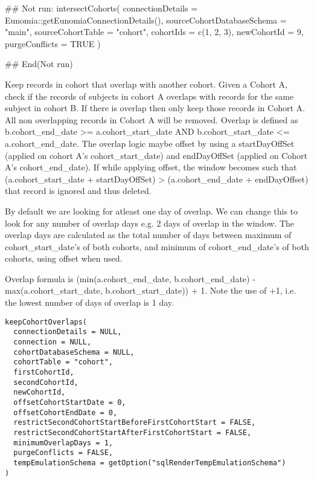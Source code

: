 \documentclass[a4paper]{book}
\begin{document}
%
\begin{Examples}
\begin{ExampleCode}
## Not run: 
intersectCohorts(
  connectionDetails = Eunomia::getEunomiaConnectionDetails(),
  sourceCohortDatabaseSchema = "main",
  sourceCohortTable = "cohort",
  cohortIds = c(1, 2, 3),
  newCohortId = 9,
  purgeConflicts = TRUE
)

## End(Not run)
\end{ExampleCode}
\end{Examples}
%
\begin{Description}\relax
Keep records in cohort that overlap with another cohort. Given a Cohort A, check if the records of
subjects in cohort A overlaps with records for the same subject in cohort B. If there is overlap
then only keep those records in Cohort A. All non overlapping records in Cohort A will be removed.
Overlap is defined as b.cohort\_end\_date >= a.cohort\_start\_date AND b.cohort\_start\_date <= a.cohort\_end\_date.
The overlap logic maybe offset by using a startDayOffSet (applied on cohort A's cohort\_start\_date)
and endDayOffSet (applied on Cohort A's cohort\_end\_date). If while applying offset, the window becomes
such that (a.cohort\_start\_date + startDayOffSet) > (a.cohort\_end\_date + endDayOffset) that record is ignored
and thus deleted.

By default we are looking for atleast one day of overlap. We can change this to look for any number of overlap
days e.g. 2 days of overlap in the window. The overlap days are calculated as the total number of days
between maximum of cohort\_start\_date's of both cohorts, and minimum of cohort\_end\_date's of both cohorts, using
offset when used.

Overlap formula is (min(a.cohort\_end\_date, b.cohort\_end\_date) - max(a.cohort\_start\_date, b.cohort\_start\_date)) + 1.
Note the use of +1, i.e. the lowest number of days of overlap is 1 day.

\strong{[Experimental]}
\end{Description}
%
\begin{Usage}
\begin{verbatim}
keepCohortOverlaps(
  connectionDetails = NULL,
  connection = NULL,
  cohortDatabaseSchema = NULL,
  cohortTable = "cohort",
  firstCohortId,
  secondCohortId,
  newCohortId,
  offsetCohortStartDate = 0,
  offsetCohortEndDate = 0,
  restrictSecondCohortStartBeforeFirstCohortStart = FALSE,
  restrictSecondCohortStartAfterFirstCohortStart = FALSE,
  minimumOverlapDays = 1,
  purgeConflicts = FALSE,
  tempEmulationSchema = getOption("sqlRenderTempEmulationSchema")
)
\end{verbatim}
\end{Usage}
\end{document}
